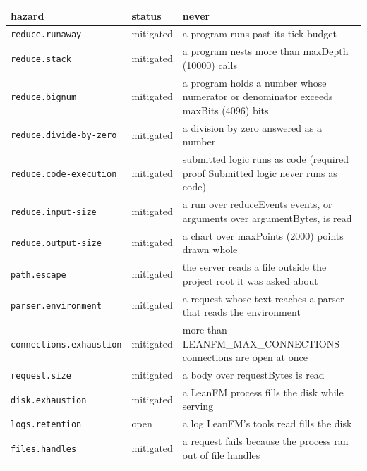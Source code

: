 \begin{longtable}{@{}p{}p{}p{}@{}}
\toprule
hazard & status & never \\
\midrule
\endhead
\texttt{reduce.runaway} & mitigated & a program runs past its tick budget \\
\texttt{reduce.stack} & mitigated & a program nests more than maxDepth (10000) calls \\
\texttt{reduce.bignum} & mitigated & a program holds a number whose numerator or denominator exceeds maxBits (4096) bits \\
\texttt{reduce.divide-by-zero} & mitigated & a division by zero answered as a number \\
\texttt{reduce.code-execution} & mitigated & submitted logic runs as code (required proof Submitted logic never runs as code) \\
\texttt{reduce.input-size} & mitigated & a run over reduceEvents events, or arguments over argumentBytes, is read \\
\texttt{reduce.output-size} & mitigated & a chart over maxPoints (2000) points drawn whole \\
\texttt{path.escape} & mitigated & the server reads a file outside the project root it was asked about \\
\texttt{parser.environment} & mitigated & a request whose text reaches a parser that reads the environment \\
\texttt{connections.exhaustion} & mitigated & more than LEANFM\_MAX\_CONNECTIONS connections are open at once \\
\texttt{request.size} & mitigated & a body over requestBytes is read \\
\texttt{disk.exhaustion} & mitigated & a LeanFM process fills the disk while serving \\
\texttt{logs.retention} & open & a log LeanFM's tools read fills the disk \\
\texttt{files.handles} & mitigated & a request fails because the process ran out of file handles \\
\bottomrule
\end{longtable}
